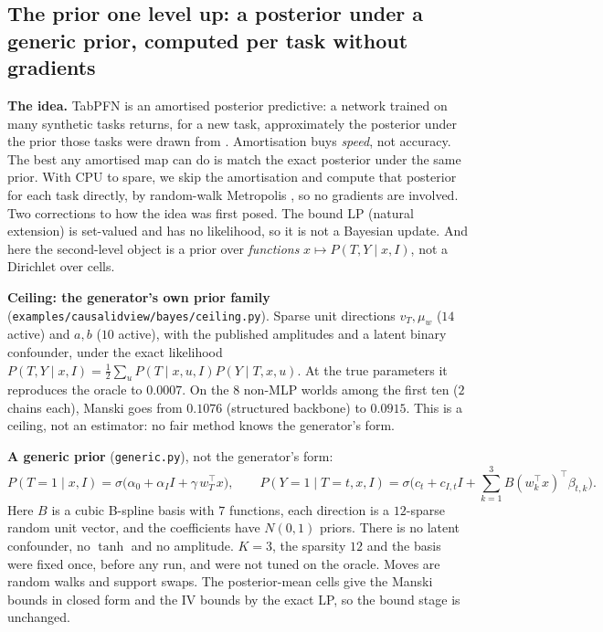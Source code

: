 \documentclass[11pt]{article}
\theoremstyle{definition}
\theoremstyle{remark}
\begin{document}
\subsection{The prior one level up: a posterior under a generic prior, computed per task without gradients}\label{sec:bayesprior}
\textbf{The idea.} TabPFN is an amortised posterior predictive: a network trained on many synthetic tasks returns, for a new task, approximately the posterior under the prior those tasks were drawn from \cite{mullerpfn22,tabpfn}. Amortisation buys \emph{speed}, not accuracy. The best any amortised map can do is match the exact posterior under the same prior. With CPU to spare, we skip the amortisation and compute that posterior for each task directly, by random-walk Metropolis \cite{metropolis53,hastings70}, so no gradients are involved. Two corrections to how the idea was first posed. The bound LP (natural extension) is set-valued and has no likelihood, so it is not a Bayesian update. And here the second-level object is a prior over \emph{functions} $x\mapsto P(T,Y\mid x,I)$, not a Dirichlet over cells.

\textbf{Ceiling: the generator's own prior family} (\texttt{examples/causalidview/bayes/ceiling.py}). Sparse unit directions $v_T,\mu_w$ ($14$ active) and $a,b$ ($10$ active), with the published amplitudes and a latent binary confounder, under the exact likelihood $P(T,Y\mid x,I)=\tfrac12\sum_u P(T\mid x,u,I)P(Y\mid T,x,u)$. At the true parameters it reproduces the oracle to $0.0007$. On the $8$ non-MLP worlds among the first ten ($2$ chains each), Manski goes from $0.1076$ (structured backbone) to $0.0915$. This is a ceiling, not an estimator: no fair method knows the generator's form.

\textbf{A generic prior} (\texttt{generic.py}), not the generator's form:
\[
P(T{=}1\mid x,I)=\sigma\big(\alpha_0+\alpha_I I+\gamma\,w_T^\top x\big),\qquad
P(Y{=}1\mid T{=}t,x,I)=\sigma\Big(c_t+c_{I,t}I+\sum_{k=1}^{3}B(w_k^\top x)^\top\beta_{t,k}\Big).
\]
Here $B$ is a cubic B-spline basis with $7$ functions, each direction is a $12$-sparse random unit vector, and the coefficients have $N(0,1)$ priors. There is no latent confounder, no $\tanh$ and no amplitude. $K=3$, the sparsity $12$ and the basis were fixed once, before any run, and were not tuned on the oracle. Moves are random walks and support swaps. The posterior-mean cells give the Manski bounds in closed form and the IV bounds by the exact LP, so the bound stage is unchanged.
\end{document}
